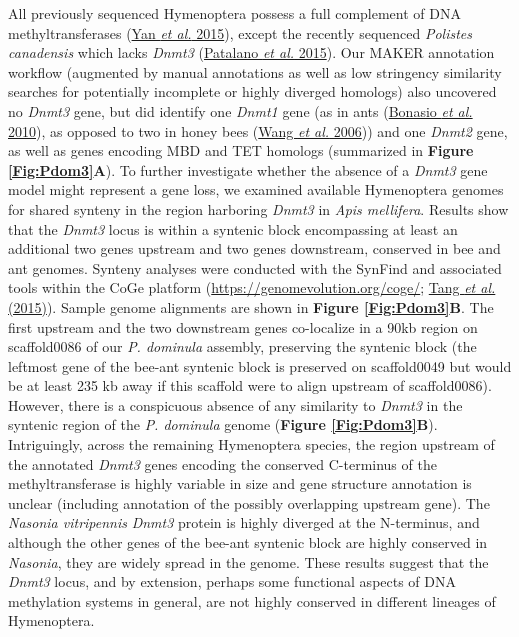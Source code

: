 All previously sequenced Hymenoptera possess a full complement of DNA
methyltransferases (\protect\hyperlink{ux5fENREFux5f75}{Yan \textit{et
al.} 2015}), except the recently sequenced \textit{Polistes canadensis}
which lacks \textit{Dnmt3} (\protect\hyperlink{ux5fENREFux5f43}{Patalano
\textit{et al.} 2015}). Our MAKER annotation workflow (augmented by manual
annotations as well as low stringency similarity searches for
potentially incomplete or highly diverged homologs) also uncovered no
\textit{Dnmt3} gene, but did identify one \textit{Dnmt1} gene (as in ants
(\protect\hyperlink{ux5fENREFux5f5}{Bonasio \textit{et al.} 2010}), as
opposed to two in honey bees (\protect\hyperlink{ux5fENREFux5f66}{Wang
\textit{et al.} 2006})) and one \textit{Dnmt2} gene, as well as genes
encoding MBD and TET homologs (summarized in \textbf{Figure \ref{Fig:Pdom3}A}). To
further investigate whether the absence of a \textit{Dnmt3} gene model
might represent a gene loss, we examined available Hymenoptera genomes
for shared synteny in the region harboring \textit{Dnmt3} in \textit{Apis
mellifera}. Results show that the \textit{Dnmt3} locus is within a
syntenic block encompassing at least an additional two genes upstream
and two genes downstream, conserved in bee and ant genomes. Synteny
analyses were conducted with the SynFind and associated tools within the
CoGe platform (\url{https://genomevolution.org/coge/};
\protect\hyperlink{ux5fENREFux5f60}{Tang \textit{et al.} (2015)}). Sample
genome alignments are shown in \textbf{Figure \ref{Fig:Pdom3}B}. The first upstream
and the two downstream genes co-localize in a 90kb region on
scaffold0086 of our \textit{P. dominula} assembly, preserving the syntenic
block (the leftmost gene of the bee-ant syntenic block is preserved on
scaffold0049 but would be at least 235 kb away if this scaffold were to
align upstream of scaffold0086). However, there is a conspicuous absence
of any similarity to \textit{Dnmt3} in the syntenic region of the \textit{P.
dominula} genome (\textbf{Figure \ref{Fig:Pdom3}B}). Intriguingly, across the
remaining Hymenoptera species, the region upstream of the annotated
\textit{Dnmt3} genes encoding the conserved C-terminus of the
methyltransferase is highly variable in size and gene structure
annotation is unclear (including annotation of the possibly overlapping
upstream gene). The \textit{Nasonia vitripennis} \textit{Dnmt3} protein is
highly diverged at the N-terminus, and although the other genes of the
bee-ant syntenic block are highly conserved in \textit{Nasonia}, they are
widely spread in the genome. These results suggest that the \textit{Dnmt3}
locus, and by extension, perhaps some functional aspects of DNA
methylation systems in general, are not highly conserved in different
lineages of Hymenoptera.

